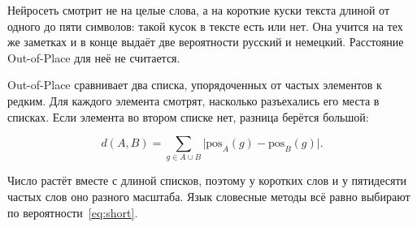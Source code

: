 Нейросеть смотрит не на целые слова, а на короткие куски текста длиной от одного до пяти символов: такой кусок в тексте есть или нет. Она учится на тех же заметках и в конце выдаёт две вероятности \mdash русский и немецкий. Расстояние Out-of-Place для неё не считается.

Out-of-Place сравнивает два списка, упорядоченных от частых элементов к редким. Для каждого элемента смотрят, насколько разъехались его места в списках. Если элемента во втором списке нет, разница берётся большой:

\begin{equation}
	d(A,B) = \sum_{g \in A \cup B} \lvert \mathrm{pos}_A(g) - \mathrm{pos}_B(g) \rvert.
	\label{eq:oop}
\end{equation}

Число растёт вместе с длиной списков, поэтому у коротких слов и у пятидесяти частых слов оно разного масштаба. Язык словесные методы всё равно выбирают по вероятности~\eqref{eq:short}.
